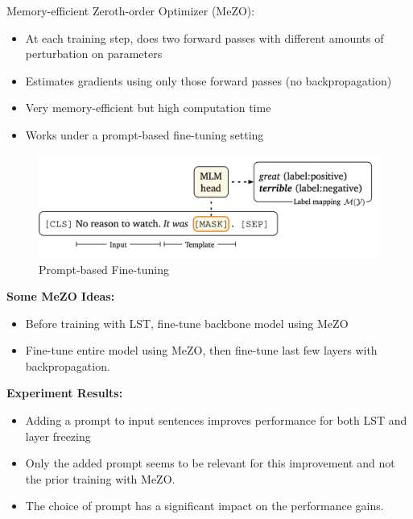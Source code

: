 Memory-efficient Zeroth-order Optimizer (MeZO):

\begin{itemize}
    \item At each training step, does two forward passes with different amounts of perturbation on parameters
    \item Estimates gradients using only those forward passes (no backpropagation)
    \item Very memory-efficient but high computation time
    \item Works under a prompt-based fine-tuning setting
\end{itemize}

\begin{figure}
    \centering
    \includegraphics[width=\textwidth]{assets/images/Prompt.png}
    \caption{Prompt-based Fine-tuning}
    \label{fig:prompt}
\end{figure}

\textbf{Some MeZO Ideas:}
\begin{itemize}
    \item Before training with LST, fine-tune backbone model using MeZO
    \item Fine-tune entire model using MeZO, then fine-tune last few layers with backpropagation. 
\end{itemize}

\textbf{Experiment Results:}
\begin{itemize}
    \item Adding a prompt to input sentences improves performance for both LST and layer freezing
    \item Only the added prompt seems to be relevant for this improvement and not the prior training with MeZO.
    \item The choice of prompt has a significant impact on the performance gains.
\end{itemize}
